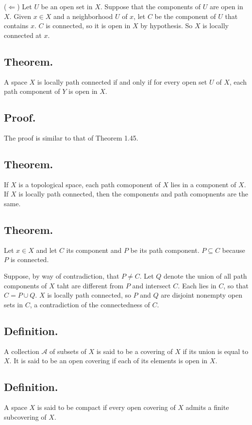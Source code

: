 \documentclass[titlepage]{article}
\begin{document}
($\Leftarrow$) Let $U$ be an open set in $X$. Suppose that the components of $U$ are open in $X$. Given $x \in X$ and a neighborhood $U$ of $x$, let $C$ be the component of $U$ that contains $x$. $C$ is connected, so it is open in $X$ by hypothesis. So $X$ is locally connected at $x$.

\subsection{Theorem.} A space $X$ is locally path connected if and only if for every open set $U$ of $X$, each path component of $Y$ is open in $X$.

\subsection{Proof.} The proof is similar to that of Theorem 1.45.

\subsection{Theorem.} If $X$ is a topological space, each path comoponent of $X$ lies in a component of $X$. If $X$ is locally path connected, then the components and path comopnents are the same.

\subsection{Theorem.} Let $x \in X$ and let $C$ its component and $P$ be its path component. $P \subseteq C$ because $P$ is connected.

Suppose, by way of contradiction, that $P \neq C$. Let $Q$ denote the union of all path components of $X$ taht are different from $P$ and intersect $C$. Each lies in $C$, so that $C = P \cup Q$. $X$ is locally path connected, so $P$ and $Q$ are disjoint nonempty open sets in $C$, a contradiction of the connectedness of $C$.

\subsection{Definition.} A collection $\mathcal{A}$ of subsets of $X$ is said to be a covering of $X$ if its union is equal to $X$. It is said to be an open covering if each of its elements is open in $X$.

\subsection{Definition.} A space $X$ is said to be compact if every open covering of $X$ admits a finite subcovering of $X$.
\end{document}
